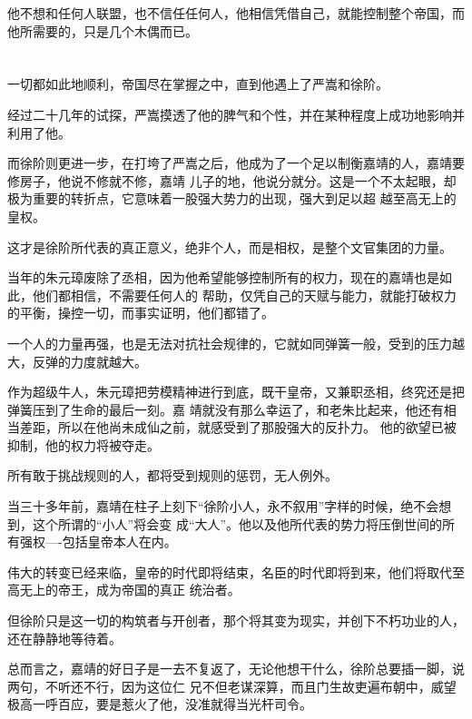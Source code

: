 \documentclass[11pt,a4paper,onecolumn]{article}
\begin{document}
他不想和任何人联盟，也不信任任何人，他相信凭借自己，就能控制整个帝国，而他所需要的，只是几个木偶而已。

\section[\thesection]{}

一切都如此地顺利，帝国尽在掌握之中，直到他遇上了严嵩和徐阶。

经过二十几年的试探，严嵩摸透了他的脾气和个性，并在某种程度上成功地影响并利用了他。

而徐阶则更进一步，在打垮了严嵩之后，他成为了一个足以制衡嘉靖的人，嘉靖要修房子，他说不修就不修，嘉靖
儿子的地，他说分就分。这是一个不太起眼，却极为重要的转折点，它意味着一股强大势力的出现，强大到足以超
越至高无上的皇权。

这才是徐阶所代表的真正意义，绝非个人，而是相权，是整个文官集团的力量。

当年的朱元璋废除了丞相，因为他希望能够控制所有的权力，现在的嘉靖也是如此，他们都相信，不需要任何人的
帮助，仅凭自己的天赋与能力，就能打破权力的平衡，操控一切，而事实证明，他们都错了。

一个人的力量再强，也是无法对抗社会规律的，它就如同弹簧一般，受到的压力越大，反弹的力度就越大。

作为超级牛人，朱元璋把劳模精神进行到底，既干皇帝，又兼职丞相，终究还是把弹簧压到了生命的最后一刻。嘉
靖就没有那么幸运了，和老朱比起来，他还有相当差距，所以在他尚未成仙之前，就感受到了那股强大的反扑力。
他的欲望已被抑制，他的权力将被夺走。

所有敢于挑战规则的人，都将受到规则的惩罚，无人例外。

当三十多年前，嘉靖在柱子上刻下``徐阶小人，永不叙用''字样的时候，绝不会想到，这个所谓的``小人''将会变
成``大人''。他以及他所代表的势力将压倒世间的所有强权----包括皇帝本人在内。

伟大的转变已经来临，皇帝的时代即将结束，名臣的时代即将到来，他们将取代至高无上的帝王，成为帝国的真正
统治者。

但徐阶只是这一切的构筑者与开创者，那个将其变为现实，并创下不朽功业的人，还在静静地等待着。

总而言之，嘉靖的好日子是一去不复返了，无论他想干什么，徐阶总要插一脚，说两句，不听还不行，因为这位仁
兄不但老谋深算，而且门生故吏遍布朝中，威望极高一呼百应，要是惹火了他，没准就得当光杆司令。

\section[\thesection]{}
\end{document}
